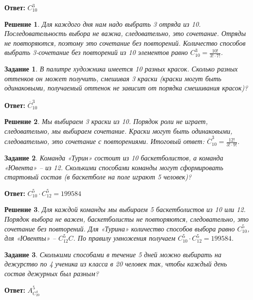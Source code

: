 \documentclass[a4paper,oneside]{memoir}
\newtheorem{task}{Задание}
\newtheorem{solution}{Решение}
\begin{document}
\textbf{Ответ:} $ C_{10}^3 $

\begin{solution}
	Для каждого дня нам надо выбрать 3 отряда из 10. Последовательность выбора не важна, следовательно, это сочетание. Отряды не повторяются, поэтому это сочетание без повторений. Количество способов выбрать 3-сочетание без повторений из 10 элементов равно $ C_{10}^3 = \frac{10!}{3!\cdot7!} $.
\end{solution}

\hrulefill
\begin{task}
	В палитре художника имеется 10 разных красок. Сколько разных оттенков он может получить, смешивая 3 краски (краски могут быть одинаковыми, получаемый оттенок не зависит от порядка смешивания красок)?
\end{task}

\textbf{Ответ:} $ \overline{C}_{10}^3 $

\begin{solution}
	Мы выбираем 3 краски из 10. Порядок роли не играет, следовательно, мы выбираем сочетание. Краски могут быть одинаковыми, следовательно, это сочетание с повторениями. Итоговый ответ: $ \overline{C}_{10}^3 = \frac{12!}{3! \cdot 9!} $.
\end{solution}

\hrulefill
\begin{task}
	Команда «Турин» состоит из 10 баскетболистов, а команда «Ювента» -- из 12. Сколькими способами команды могут сформировать стартовый состав (в баскетболе на поле играют 5 человек)?
\end{task}

\textbf{Ответ:} $ C_{10}^5 \cdot C_{12}^5 =199584 $

\begin{solution}
	Для каждой команды мы выбираем 5 баскетболистов из 10 или 12. Порядок выбора не важен, баскетболисты не повторяются, следовательно, это сочетание без повторений. Для «Турина» количество способов выбора равно $ C_{10}^5 $, для «Ювенты» -- $ C_{12}^5C $. По правилу умножения получаем $ C_{10}^5 \cdot C_{12}^5 =199584 $.
\end{solution}

\hrulefill
\begin{task}
	Сколькими способами в течение 5 дней можно выбирать на дежурство по 4 ученика из класса в 20 человек так, чтобы каждый день состав дежурных был разным?
\end{task}

\textbf{Ответ:} $ A_{C_{20}^4}^5 $
\end{document}
